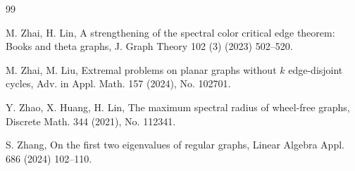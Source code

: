 \documentclass[11pt]{article}
\begin{document}
\begin{thebibliography}{99}

M. Zhai, H. Lin,
A strengthening of the spectral color critical edge
theorem: Books and theta graphs,
J. Graph Theory 102 (3) (2023) 502--520. 

M. Zhai, M. Liu,  Extremal problems on planar graphs without $k$ edge-disjoint cycles, Adv. in Appl. Math. 157 (2024), No. 102701. 


Y. Zhao, X. Huang, H. Lin,  
The maximum spectral radius of wheel-free graphs, 
Discrete Math. 344 (2021),  No. 112341. 

S. Zhang, On the first two eigenvalues of regular graphs, Linear Algebra Appl. 686 (2024) 102--110. 


\end{thebibliography}
\end{document}

